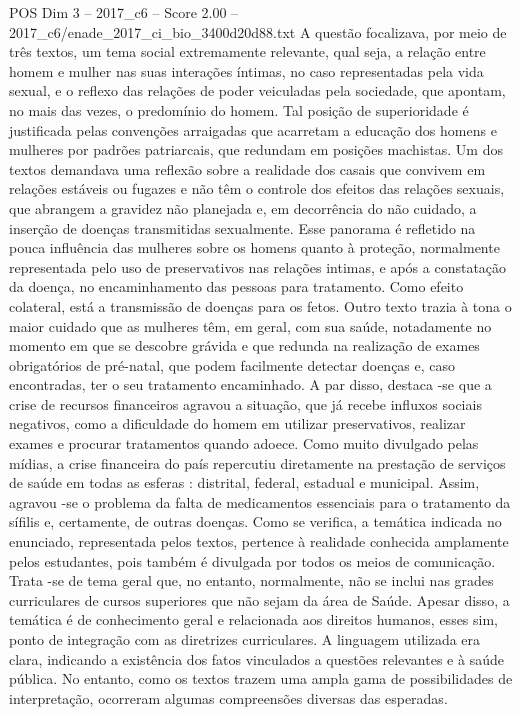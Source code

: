\begin{textsample}{POS Dim 3 – 2017\_c6 – Score 2.00 – 2017\_c6/enade\_2017\_ci\_bio\_3400d20d88.txt}
A questão focalizava, por meio de três textos, um tema social extremamente relevante, qual seja, a relação entre homem e mulher nas suas interações íntimas, no caso representadas pela vida sexual, e o reflexo das relações de poder veiculadas pela sociedade, que apontam, no mais das vezes, o predomínio do homem.
Tal posição de superioridade é justificada pelas convenções arraigadas que acarretam a educação dos homens e mulheres por padrões patriarcais, que redundam em posições machistas.
Um dos textos demandava uma reflexão sobre a realidade dos casais que convivem em relações estáveis ou fugazes e não têm o controle dos efeitos das relações sexuais, que abrangem a gravidez não planejada e, em decorrência do não cuidado, a inserção de doenças transmitidas sexualmente.
Esse panorama é refletido na pouca influência das mulheres sobre os homens quanto à proteção, normalmente representada pelo uso de preservativos nas relações intimas, e após a constatação da doença, no encaminhamento das pessoas para tratamento.
Como efeito colateral, está a transmissão de doenças para os fetos.
Outro texto trazia à tona o maior cuidado que as mulheres têm, em geral, com sua saúde, notadamente no momento em que se descobre grávida e que redunda na realização de exames obrigatórios de pré-natal, que podem facilmente detectar doenças e, caso encontradas, ter o seu tratamento encaminhado.
A par disso, destaca -se que a crise de recursos financeiros agravou a situação, que já recebe influxos sociais negativos, como a dificuldade do homem em utilizar preservativos, realizar exames e procurar tratamentos quando adoece.
Como muito divulgado pelas mídias, a crise financeira do país repercutiu diretamente na prestação de serviços de saúde em todas as esferas : distrital, federal, estadual e municipal.
Assim, agravou -se o problema da falta de medicamentos essenciais para o tratamento da sífilis e, certamente, de outras doenças.
Como se verifica, a temática indicada no enunciado, representada pelos textos, pertence à realidade conhecida amplamente pelos estudantes, pois também é divulgada por todos os meios de comunicação.
Trata -se de tema geral que, no entanto, normalmente, não se inclui nas grades curriculares de cursos superiores que não sejam da área de Saúde.
Apesar disso, a temática é de conhecimento geral e relacionada aos direitos humanos, esses sim, ponto de integração com as diretrizes curriculares.
A linguagem utilizada era clara, indicando a existência dos fatos vinculados a questões relevantes e à saúde pública.
No entanto, como os textos trazem uma ampla gama de possibilidades de interpretação, ocorreram algumas compreensões diversas das esperadas.

\end{textsample}
